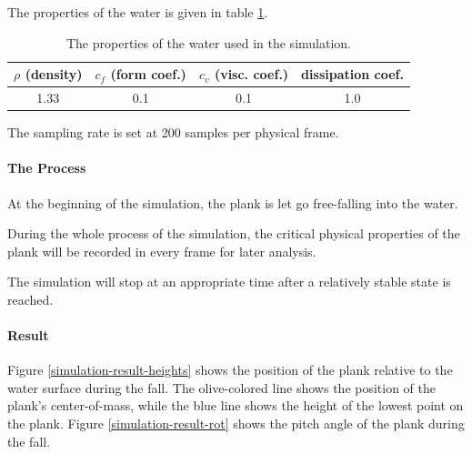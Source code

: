 The properties of the water is given in table \ref{simulation-water-properties}.

\begin{table}[h]
	\centering
	\begin{tabular}{ c c c c }
		\hline
		$\rho$ {\footnotesize(density)} & $c_f$ {\footnotesize(form coef.)} & $c_v$ {\footnotesize(visc. coef.)} & {\small dissipation coef.} \\
		\hline
		1.33 & 0.1 & 0.1 & 1.0 \\
		\hline
	\end{tabular}
	\caption{The properties of the water used in the simulation.}
	\label{simulation-water-properties}
\end{table}

The sampling rate is set at 200 samples per physical frame.

\paragraph*{The Process}

At the beginning of the simulation, the plank is let go free-falling into the water.

During the whole process of the simulation, the critical physical properties of the plank will be recorded in every frame for later analysis.

The simulation will stop at an appropriate time after a relatively stable state is reached.

\paragraph*{Result}

Figure \ref{simulation-result-heights} shows the position of the plank relative to the water surface during the fall.
The olive-colored line shows the position of the plank's center-of-mass, while the blue line shows the height of the lowest point on the plank.
Figure \ref{simulation-result-rot} shows the pitch angle of the plank during the fall.

